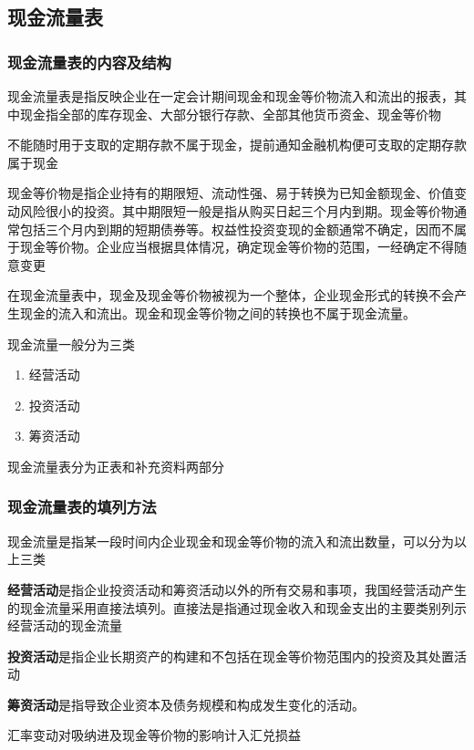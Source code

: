\documentclass[UTF8,12pt]{ctexart}
\numberwithin{equation}{section} %
\numberwithin{figure}{section}
\numberwithin{table}{section}
\begin{document}
	
	
	\subsection{现金流量表}
	\subsubsection{现金流量表的内容及结构}
	现金流量表是指反映企业在一定会计期间现金和现金等价物流入和流出的报表，其中现金指全部的库存现金、大部分银行存款、全部其他货币资金、现金等价物
	
	不能随时用于支取的定期存款不属于现金，提前通知金融机构便可支取的定期存款属于现金
	
	现金等价物是指企业持有的期限短、流动性强、易于转换为已知金额现金、价值变动风险很小的投资。其中期限短一般是指从购买日起三个月内到期。现金等价物通常包括三个月内到期的短期债券等。权益性投资变现的金额通常不确定，因而不属于现金等价物。企业应当根据具体情况，确定现金等价物的范围，一经确定不得随意变更
	
	在现金流量表中，现金及现金等价物被视为一个整体，企业现金形式的转换不会产生现金的流入和流出。现金和现金等价物之间的转换也不属于现金流量。
	
	现金流量一般分为三类
	\begin{enumerate}
		\item 经营活动
		
		\item 投资活动
		
		\item 筹资活动
	\end{enumerate}
	现金流量表分为正表和补充资料两部分
	
	\subsubsection{现金流量表的填列方法}
	现金流量是指某一段时间内企业现金和现金等价物的流入和流出数量，可以分为以上三类
	
	\textbf{经营活动}是指企业投资活动和筹资活动以外的所有交易和事项，我国经营活动产生的现金流量采用直接法填列。直接法是指通过现金收入和现金支出的主要类别列示经营活动的现金流量
	
	\textbf{投资活动}是指企业长期资产的构建和不包括在现金等价物范围内的投资及其处置活动
	
	\textbf{筹资活动}是指导致企业资本及债务规模和构成发生变化的活动。
	
	
	汇率变动对吸纳进及现金等价物的影响计入汇兑损益
	
\end{document}
